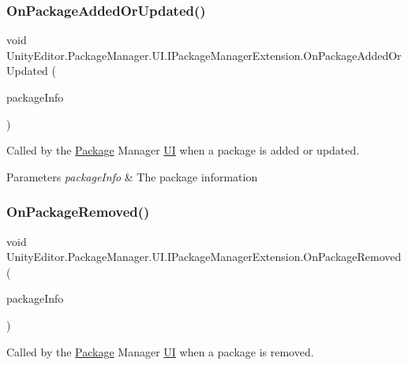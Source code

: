 \subsubsection{\texorpdfstring{OnPackageAddedOrUpdated()}{OnPackageAddedOrUpdated()}}
{\footnotesize\ttfamily void Unity\+Editor.\+Package\+Manager.\+U\+I.\+I\+Package\+Manager\+Extension.\+On\+Package\+Added\+Or\+Updated (\begin{DoxyParamCaption}\item[{Package\+Manager.\+Package\+Info}]{package\+Info }\end{DoxyParamCaption})}



Called by the \mbox{\hyperlink{class_unity_editor_1_1_package_manager_1_1_u_i_1_1_package}{Package}} Manager \mbox{\hyperlink{namespace_unity_editor_1_1_package_manager_1_1_u_i}{UI}} when a package is added or updated. 


\begin{DoxyParams}{Parameters}
{\em package\+Info} & The package information\\
\hline
\end{DoxyParams}
\mbox{\label{interface_unity_editor_1_1_package_manager_1_1_u_i_1_1_i_package_manager_extension_a9f2d1be5e21ec127b32e8138f25b38a1}} 
\subsubsection{\texorpdfstring{OnPackageRemoved()}{OnPackageRemoved()}}
{\footnotesize\ttfamily void Unity\+Editor.\+Package\+Manager.\+U\+I.\+I\+Package\+Manager\+Extension.\+On\+Package\+Removed (\begin{DoxyParamCaption}\item[{Package\+Manager.\+Package\+Info}]{package\+Info }\end{DoxyParamCaption})}



Called by the \mbox{\hyperlink{class_unity_editor_1_1_package_manager_1_1_u_i_1_1_package}{Package}} Manager \mbox{\hyperlink{namespace_unity_editor_1_1_package_manager_1_1_u_i}{UI}} when a package is removed. 


